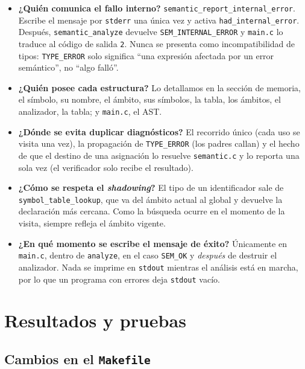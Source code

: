 \documentclass[12pt,letterpaper]{article}
\begin{document}
\begin{itemize}
\item \textbf{¿Quién comunica el fallo interno?} \texttt{semantic\_report\_internal\_error}.
  Escribe el mensaje por \texttt{stderr} una única vez y activa \texttt{had\_internal\_error}. Después,
  \texttt{semantic\_analyze} devuelve \texttt{SEM\_INTERNAL\_ERROR} y \texttt{main.c} lo traduce al código de
  salida \texttt{2}. Nunca se presenta como incompatibilidad de tipos: \texttt{TYPE\_ERROR} solo significa
  ``una expresión afectada por un error semántico'', no ``algo falló''.

\item \textbf{¿Quién posee cada estructura?} Lo detallamos en la sección de memoria, el símbolo, su nombre, el
  ámbito, sus símbolos, la tabla, los ámbitos, el analizador, la tabla; y \texttt{main.c}, el AST.

\item \textbf{¿Dónde se evita duplicar diagnósticos?} El recorrido único (cada uso se visita
  una vez), la propagación de \texttt{TYPE\_ERROR} (los padres callan) y el hecho de que el destino de una
  asignación lo resuelve \texttt{semantic.c} y lo reporta una sola vez (el verificador solo recibe el
  resultado).

\item \textbf{¿Cómo se respeta el \emph{shadowing}?} El tipo de un identificador sale de
  \texttt{symbol\_table\_lookup}, que va del ámbito actual al global y devuelve la declaración más cercana. Como
  la búsqueda ocurre en el momento de la visita, siempre refleja el ámbito vigente.

\item \textbf{¿En qué momento se escribe el mensaje de éxito?} Únicamente en \texttt{main.c}, dentro de
  \texttt{analyze}, en el caso \texttt{SEM\_OK} y \emph{después} de destruir el analizador. Nada se imprime en
  \texttt{stdout} mientras el análisis está en marcha, por lo que un programa con errores deja \texttt{stdout}
  vacío.
\end{itemize}

\section*{Resultados y pruebas}\label{sec:resultados}

\subsection*{Cambios en el \texttt{Makefile}}
\end{document}
